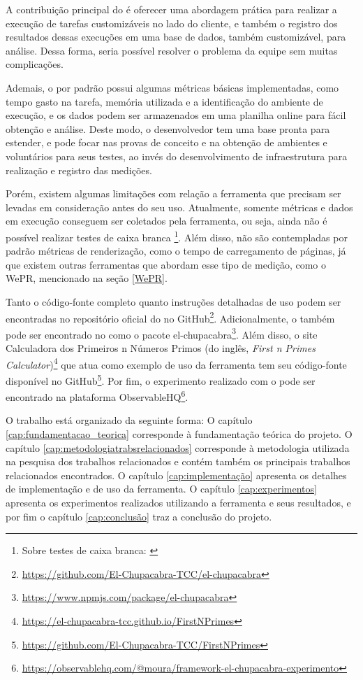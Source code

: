 \documentclass[12pt]{tcc}
\begin{document}
	A contribuição principal do  é oferecer uma abordagem prática para realizar a execução de tarefas customizáveis no lado do cliente, e também o registro dos resultados dessas execuções em uma base de dados, também customizável, para análise. Dessa forma, seria possível resolver o problema da equipe sem muitas complicações. 

	Ademais, o  por padrão possui algumas métricas básicas implementadas, como tempo gasto na tarefa, memória utilizada e a identificação do ambiente de execução, e os dados podem ser armazenados em uma planilha online para fácil obtenção e análise. Deste modo, o desenvolvedor tem uma base pronta para estender, e pode focar nas provas de conceito e na obtenção de ambientes e voluntários para seus testes, ao invés do desenvolvimento de infraestrutura para realização e registro das medições.

	Porém, existem algumas limitações com relação a ferramenta que precisam ser levadas em consideração antes do seu uso. Atualmente, somente métricas e dados em execução conseguem ser coletados pela ferramenta, ou seja, ainda não é possível realizar testes de caixa branca \footnote{Sobre testes de caixa branca: \citep[Capítulo 21]{Sommerville2015Software}}. Além disso, não são contempladas por padrão métricas de renderização, como o tempo de carregamento de páginas, já que existem outras ferramentas que abordam esse tipo de medição, como o WePR, mencionado na seção \ref{WePR}.

	Tanto o código-fonte completo quanto instruções detalhadas de uso podem ser encontradas no repositório oficial do  no GitHub\footnote{\url{https://github.com/El-Chupacabra-TCC/el-chupacabra}}.
	Adicionalmente, o  também pode ser encontrado no  como o pacote el-chupacabra\footnote{\url{https://www.npmjs.com/package/el-chupacabra}}.
	Além disso, o site Calculadora dos Primeiros n Números Primos (do inglês, \emph{First n Primes Calculator})\footnote{\url{https://el-chupacabra-tcc.github.io/FirstNPrimes}} que atua como exemplo de uso da ferramenta tem seu código-fonte disponível no GitHub\footnote{\url{https://github.com/El-Chupacabra-TCC/FirstNPrimes}}.
	Por fim, o experimento realizado com o  pode ser encontrado na plataforma ObservableHQ\footnote{\url{https://observablehq.com/@moura/framework-el-chupacabra-experimento}}.

	O trabalho está organizado da seguinte forma: O capítulo \ref{cap:fundamentacao_teorica} corresponde à fundamentação teórica do projeto. O capítulo \ref{cap:metodologiatrabsrelacionados} corresponde à metodologia utilizada na pesquisa dos trabalhos relacionados e contém também os principais trabalhos relacionados encontrados. O capítulo \ref{cap:implementação} apresenta os detalhes de implementação e de uso da ferramenta. O capítulo \ref{cap:experimentos} apresenta os experimentos realizados utilizando a ferramenta e seus resultados, e por fim o capítulo \ref{cap:conclusão} traz a conclusão do projeto.
\end{document}
